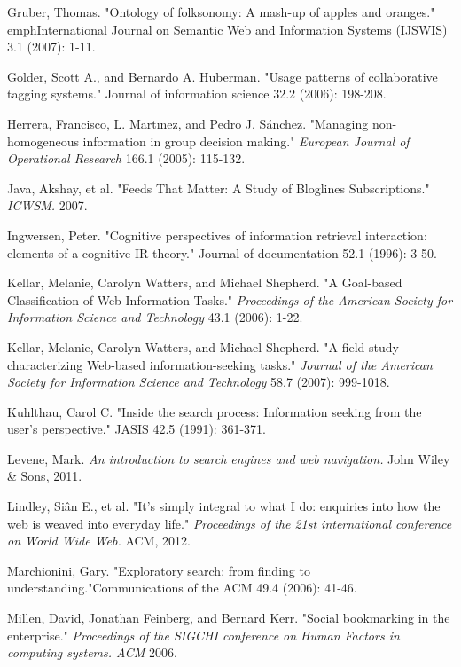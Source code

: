 \documentclass{casconpaper}
\begin{document}
{{\begin{thebibliography}{9}
Gruber, Thomas. "Ontology of folksonomy: A mash-up of apples and oranges." emph{International Journal on Semantic Web and Information Systems (IJSWIS)} 3.1 (2007): 1-11.

Golder, Scott A., and Bernardo A. Huberman. "Usage patterns of collaborative tagging systems." Journal of information science 32.2 (2006): 198-208.

Herrera, Francisco, L. Martınez, and Pedro J. Sánchez. "Managing non-homogeneous information in group decision making." \emph{European Journal of Operational Research} 166.1 (2005): 115-132.

Java, Akshay, et al. "Feeds That Matter: A Study of Bloglines Subscriptions." \emph{ ICWSM.} 2007.

Ingwersen, Peter. "Cognitive perspectives of information retrieval interaction: elements of a cognitive IR theory." Journal of documentation 52.1 (1996): 3-50.
   
 Kellar, Melanie, Carolyn Watters, and Michael Shepherd. "A Goal-based Classification of Web Information Tasks." \emph{Proceedings of the American Society for Information Science and Technology} 43.1 (2006): 1-22.

Kellar, Melanie, Carolyn Watters, and Michael Shepherd. "A field study characterizing Web-based information-seeking tasks." \emph{Journal of the American Society for Information Science and Technology} 58.7 (2007): 999-1018.

Kuhlthau, Carol C. "Inside the search process: Information seeking from the user's perspective." JASIS 42.5 (1991): 361-371.

Levene, Mark.  \emph{An introduction to search engines and web navigation.} John Wiley \& Sons, 2011.

Lindley, Siân E., et al. "It's simply integral to what I do: enquiries into how the web is weaved into everyday life." \emph{Proceedings of the 21st international conference on World Wide Web.} ACM, 2012.


Marchionini, Gary. "Exploratory search: from finding to understanding."Communications of the ACM 49.4 (2006): 41-46.



Millen, David, Jonathan Feinberg, and Bernard Kerr. "Social bookmarking in the enterprise." \emph{Proceedings of the SIGCHI conference on Human Factors in computing systems. ACM} 2006.


\end{thebibliography}}}
\end{document}
